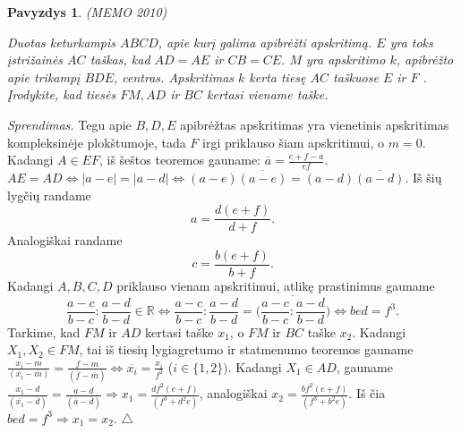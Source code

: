 \documentclass[11pt,a4paper,twoside]{book}
\newenvironment{sprendimas}{\noindent \textit{Sprendimas.}}{\hfill $\triangle$}
\newcounter{foo}[subsection]
\newtheorem{pavnr}[foo]{Pavyzdys}
\theoremstyle{definition} \newtheorem*{api}{Apibrėžimas}
\theoremstyle{remark} \newtheorem*{pastaba}{Pastaba}
\begin{document}
\begin{pavnr} 
(MEMO 2010)

Duotas keturkampis $ABCD$, apie kurį galima apibrėžti apskritimą. $E$ yra toks įstrižainės $AC$
taškas, kad $AD = AE$ ir $CB = CE$. $M$ yra apskritimo $k$, apibrėžto apie trikampį $BDE$,
centras. Apskritimas $k$ kerta tiesę $AC$ taškuose $E$ ir $F$ . Įrodykite, kad tiesės $FM, AD$ ir $BC$ kertasi viename taške.
\end{pavnr}
\begin{sprendimas}
Tegu apie $B, D, E$ apibrėžtas apskritimas yra vienetinis apskritimas kompleksinėje plokštumoje, tada $F$ irgi priklauso šiam apskritimui, o $m=0$. Kadangi $A\in EF$, iš šeštos teoremos gauname: $\overline{a}=\frac{e+f-a}{ef}$. $AE = AD \Leftrightarrow |a-e|=|a-d| \Leftrightarrow (a-e)\overline{(a-e)}=(a-d)\overline{(a-d)}$. Iš šių lygčių randame
$$a=\frac{d(e+f)}{d+f}.$$
Analogiškai randame
$$c=\frac{b(e+f)}{b+f}.$$
Kadangi $A, B, C, D$ priklauso vienam apskritimui, atlikę prastinimus gauname
$$\frac{a-c}{b-c}:\frac{a-d}{b-d}\in \mathbb{R} \Leftrightarrow \frac{a-c}{b-c}:\frac{a-d}{b-d}= \overline{\bigg(\frac{a-c}{b-c}:\frac{a-d}{b-d}\bigg)} \Leftrightarrow bed=f^3.$$
Tarkime, kad $FM$ ir $AD$ kertasi taške $x_1$, o $FM$ ir $BC$ taške $x_2$. Kadangi $X_1, X_2 \in FM$, tai iš tiesių lygiagretumo ir statmenumo teoremos gauname $\frac{x_i-m}{(\overline{x_i}-\overline{m})}=\frac{f-m}{(\overline{f}-\overline{m})} \Leftrightarrow          \overline{x_i}=\frac{x_i}{f^2}$ ($i \in \{1, 2\})$.
Kadangi $X_1 \in AD$, gauname $\frac{x_1-d}{(\overline{x_1}-\overline{d})}=\frac{a-d}{(\overline{a}-\overline{d})} \Rightarrow x_1=\frac{df^2(e+f)}{(f^3+d^2e)}$,
analogiškai $x_2=\frac{bf^2(e+f)}{(f^3+b^2e)}$.
Iš čia $bed=f^3 \Rightarrow x_1=x_2.$
\end{sprendimas}
\end{document}
